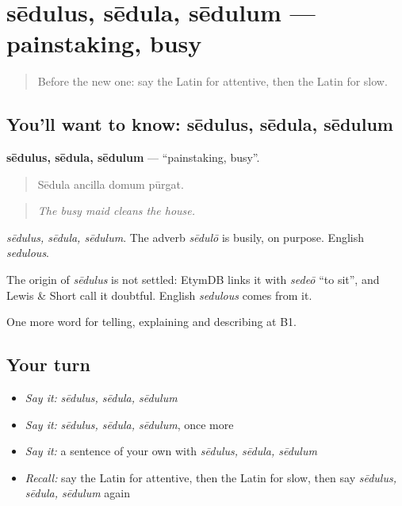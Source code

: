 \section[sēdulus, sēdula, sēdulum]{sēdulus, sēdula, sēdulum — painstaking, busy}

\label{lesson:LA-C406-sedulus}



\begin{quote}
Before the new one: say the Latin for attentive, then the Latin for slow.
\end{quote}

\subsection*{You'll want to know: sēdulus, sēdula, sēdulum}
\textbf{sēdulus, sēdula, sēdulum} — \textquotedblleft{}painstaking, busy\textquotedblright{}.

\begin{quote}
Sēdula ancilla domum pūrgat.
\end{quote}

\begin{quote}
\emph{The busy maid cleans the house.}
\end{quote}

\emph{sēdulus, sēdula, sēdulum}. The adverb \emph{sēdulō} is busily, on purpose. English \emph{sedulous}.

\begin{cousinweb}
The origin of \emph{sēdulus} is not settled: EtymDB links it with \emph{sedeō} \textquotedblleft{}to sit\textquotedblright{}, and Lewis \& Short call it doubtful. English \emph{sedulous} comes from it.
\end{cousinweb}

\begin{grammarlens}[title={What you've built}]
One more word for telling, explaining and describing at B1.
\end{grammarlens}

\subsection*{Your turn}
\begin{itemize}
\raggedright
  \item \emph{Say it:} \emph{sēdulus, sēdula, sēdulum}
  \item \emph{Say it:} \emph{sēdulus, sēdula, sēdulum}, once more
  \item \emph{Say it:} a sentence of your own with \emph{sēdulus, sēdula, sēdulum}
  \item \emph{Recall:} say the Latin for attentive, then the Latin for slow, then say \emph{sēdulus, sēdula, sēdulum} again
\end{itemize}

